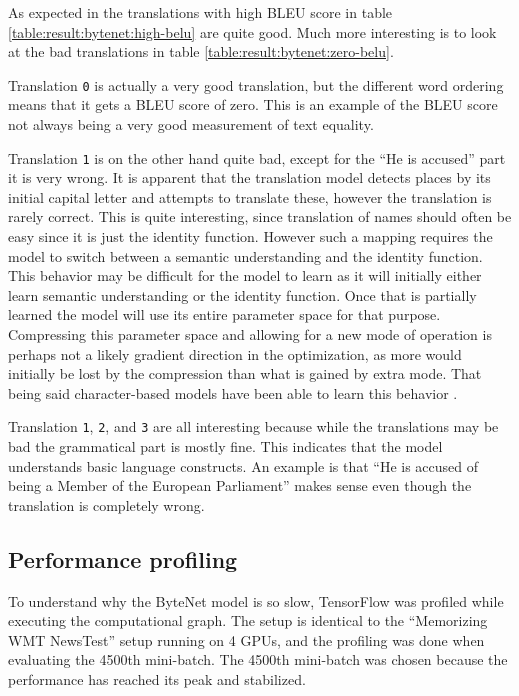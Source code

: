 As expected in the translations with high BLEU score in table \ref{table:result:bytenet:high-belu} are quite good. Much more interesting is to look at the bad translations in table \ref{table:result:bytenet:zero-belu}.

Translation \texttt{0} is actually a very good translation, but the different word ordering means that it gets a BLEU score of zero. This is an example of the BLEU score not always being a very good measurement of text equality.

Translation \texttt{1} is on the other hand quite bad, except for the ``He is accused'' part it is very wrong. It is apparent that the translation model detects places by its initial capital letter and attempts to translate these, however the translation is rarely correct. This is quite interesting, since translation of names should often be easy since it is just the identity function. However such a mapping requires the model to switch between a semantic understanding and the identity function. This behavior may be difficult for the model to learn as it will initially either learn semantic understanding or the identity function. Once that is partially learned the model will use its entire parameter space for that purpose. Compressing this parameter space and allowing for a new mode of operation is perhaps not a likely gradient direction in the optimization, as more would initially be lost by the compression than what is gained by extra mode. That being said character-based models have been able to learn this behavior \cite{citation-needed}.

Translation \texttt{1}, \texttt{2}, and \texttt{3} are all interesting because while the translations may be bad the grammatical part is mostly fine. This indicates that the model understands basic language constructs. An example is that ``He is accused of being a Member of the European Parliament'' makes sense even though the translation is completely wrong.

\clearpage
\subsection{Performance profiling}
To understand why the ByteNet model is so slow, TensorFlow was profiled while executing the computational graph. The setup is identical to the ``Memorizing WMT NewsTest'' setup running on 4 GPUs, and the profiling was done when evaluating the 4500th mini-batch. The 4500th mini-batch was chosen because the performance has reached its peak and stabilized.  

